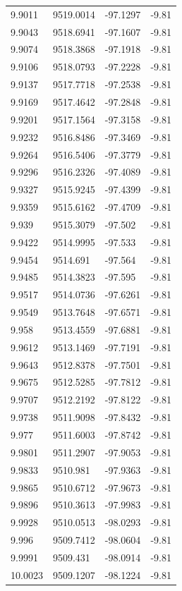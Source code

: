 \begin{table}[H]
\begin{tabular}{llll}
9.9011 & 9519.0014 & -97.1297 & -9.81 \\
9.9043 & 9518.6941 & -97.1607 & -9.81 \\
9.9074 & 9518.3868 & -97.1918 & -9.81 \\
9.9106 & 9518.0793 & -97.2228 & -9.81 \\
9.9137 & 9517.7718 & -97.2538 & -9.81 \\
9.9169 & 9517.4642 & -97.2848 & -9.81 \\
9.9201 & 9517.1564 & -97.3158 & -9.81 \\
9.9232 & 9516.8486 & -97.3469 & -9.81 \\
9.9264 & 9516.5406 & -97.3779 & -9.81 \\
9.9296 & 9516.2326 & -97.4089 & -9.81 \\
9.9327 & 9515.9245 & -97.4399 & -9.81 \\
9.9359 & 9515.6162 & -97.4709 & -9.81 \\
9.939 & 9515.3079 & -97.502 & -9.81 \\
9.9422 & 9514.9995 & -97.533 & -9.81 \\
9.9454 & 9514.691 & -97.564 & -9.81 \\
9.9485 & 9514.3823 & -97.595 & -9.81 \\
9.9517 & 9514.0736 & -97.6261 & -9.81 \\
9.9549 & 9513.7648 & -97.6571 & -9.81 \\
9.958 & 9513.4559 & -97.6881 & -9.81 \\
9.9612 & 9513.1469 & -97.7191 & -9.81 \\
9.9643 & 9512.8378 & -97.7501 & -9.81 \\
9.9675 & 9512.5285 & -97.7812 & -9.81 \\
9.9707 & 9512.2192 & -97.8122 & -9.81 \\
9.9738 & 9511.9098 & -97.8432 & -9.81 \\
9.977 & 9511.6003 & -97.8742 & -9.81 \\
9.9801 & 9511.2907 & -97.9053 & -9.81 \\
9.9833 & 9510.981 & -97.9363 & -9.81 \\
9.9865 & 9510.6712 & -97.9673 & -9.81 \\
9.9896 & 9510.3613 & -97.9983 & -9.81 \\
9.9928 & 9510.0513 & -98.0293 & -9.81 \\
9.996 & 9509.7412 & -98.0604 & -9.81 \\
9.9991 & 9509.431 & -98.0914 & -9.81 \\
10.0023 & 9509.1207 & -98.1224 & -9.81 \\

\end{tabular}
\end{table}
